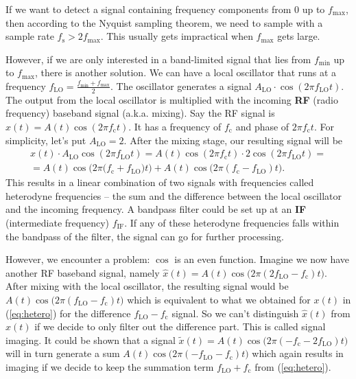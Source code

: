 \documentclass[a4paper,12pt,twoside,openright]{report}
\begin{document}
If we want to detect a signal containing frequency components from $0$ up to $f_\text{max}$, then according to the Nyquist sampling theorem, we need to sample with a sample rate $f_\text{s} > 2 f_\text{max}$. This usually gets impractical when $f_\text{max}$ gets large.

However, if we are only interested in a band-limited signal that lies from $f_\text{min}$ up to $f_\text{max}$, there is another solution. We can have a local oscillator that runs at a frequency $f_\text{LO} = \frac{f_\text{min}+f_\text{max}}{2}$. The oscillator generates a signal $A_\text{LO} \cdot \cos(2 \pi f_\text{LO} t)$. The output from the local oscillator is multiplied with the incoming \textbf{RF} (radio frequency) baseband signal (a.k.a. mixing). Say the RF signal is $x(t) = A(t) \cos(2 \pi f_\text{c} t)$. It has a frequency of $f_\text{c}$ and phase of $2 \pi f_\text{c} t$. For simplicity, let's put $A_\text{LO} = 2$. After the mixing stage, our resulting signal will be
\begin{multline}
\label{eq:hetero}
x(t) \cdot A_\text{LO} \cos(2 \pi f_\text{LO} t) =  A(t) \cos(2 \pi f_\text{c} t) \cdot 2 \cos(2 \pi f_\text{LO} t) = \\
=  A(t) \cos\big( 2 \pi (f_\text{c} + f_\text{LO} \big) t\big) + A(t) \cos\big( 2 \pi (f_\text{c} - f_\text{LO}) t \big) .
\end{multline}
This results in a linear combination of two signals with frequencies called heterodyne frequencies -- the sum and the difference between the local oscillator and the incoming frequency. A bandpass filter could be set up at an \textbf{IF} (intermediate frequency) $f_\text{IF}$. If any of these heterodyne frequencies falls within the bandpass of the filter, the signal can go for further processing.

However, we encounter a problem: $\cos$ is an even function. Imagine we now have another RF baseband signal, namely $\hat{x}(t) = A(t) \cos\big( 2 \pi (2 f_\text{LO} - f_\text{c}) t\big)$. After mixing with the local oscillator, the resulting signal would be $A(t) \cos\big( 2 \pi (f_\text{LO} - f_\text{c}) t \big)$ which is equivalent to what we obtained for $x(t)$ in (\ref{eq:hetero}) for the difference $f_\text{LO} - f_\text{c}$ signal. So we can't distinguish $\hat{x}(t)$ from $x(t)$ if we decide to only filter out the difference part. This is called signal imaging. It could be shown that a signal $\tilde{x}(t) = A(t) \cos\big( 2 \pi (- f_\text{c} - 2 f_\text{LO}) t\big)$ will in turn generate a sum $A(t) \cos\big( 2 \pi ( - f_\text{LO} - f_\text{c}) t \big)$ which again results in imaging if we decide to keep the summation term $f_\text{LO} + f_\text{c}$ from (\ref{eq:hetero}).
\end{document}
